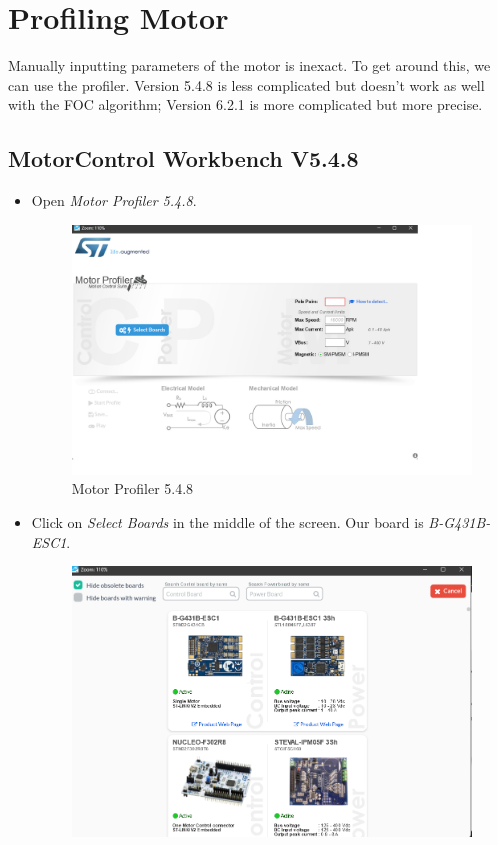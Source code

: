 \documentclass[10pt]{article}
\begin{document}
	\FloatBarrier \section{Profiling Motor}
		Manually inputting parameters of the motor is inexact. To get around this, we can use the profiler. Version 5.4.8 is less complicated but doesn't work as well with the FOC algorithm; Version 6.2.1 is more complicated but more precise.
		\FloatBarrier \subsection{MotorControl Workbench V5.4.8}
            \begin{itemize}
                \item Open \emph{Motor Profiler 5.4.8}.
                \begin{figure}[H]
                    \centerline{\includegraphics[width=\textwidth]{References/Motor Profiler.png}}
                    \caption{Motor Profiler 5.4.8}
                \end{figure}
                \item Click on \emph{Select Boards} in the middle of the screen. Our board is \emph{B-G431B-ESC1}.
                    \begin{figure}[H]
                        \centerline{\includegraphics[width=\textwidth]{References/Motor Profiler Select Board.png}}

\end{figure}
\end{itemize}
\end{document}
